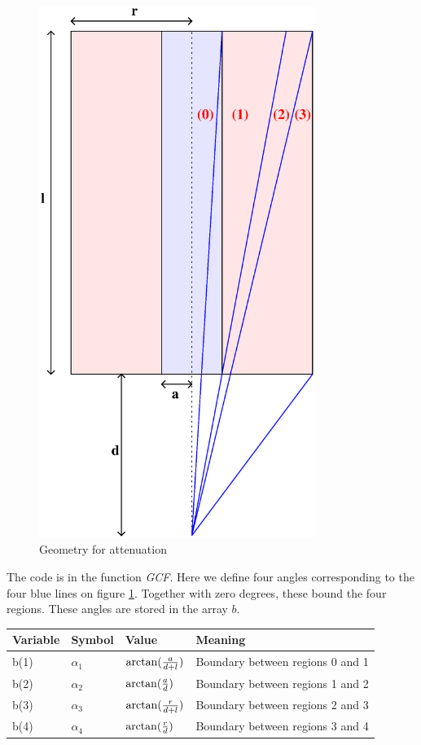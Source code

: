 \begin{figure}[ht!]
\includegraphics[width=0.8\textwidth]{geometry_for_attenuation.eps}
\caption{Geometry for attenuation}
\label{fig:atten}
\end{figure}

\noindent The code is in the function \emph{GCF}. Here we define four
angles corresponding to the four blue lines on figure \ref{fig:atten}.
Together with zero degrees, these bound the four regions. These angles
are stored in the array $b$.

\begin{center}
\begin{tabular}{|llll|}
\hline
Variable & Symbol & Value & Meaning\\
\hline
b(1) & $\alpha_1$ & $\arctan({a \over d + l})$ & Boundary between regions 0 and 1\\
b(2) & $\alpha_2$ & $\arctan({a \over d})$ & Boundary between regions 1 and 2\\
b(3) & $\alpha_3$ & $\arctan({r \over d + l})$ & Boundary between regions 2 and 3\\
b(4) & $\alpha_4$ & $\arctan({r \over d})$ & Boundary between regions 3 and 4\\
\hline
\end{tabular}
\end{center}

